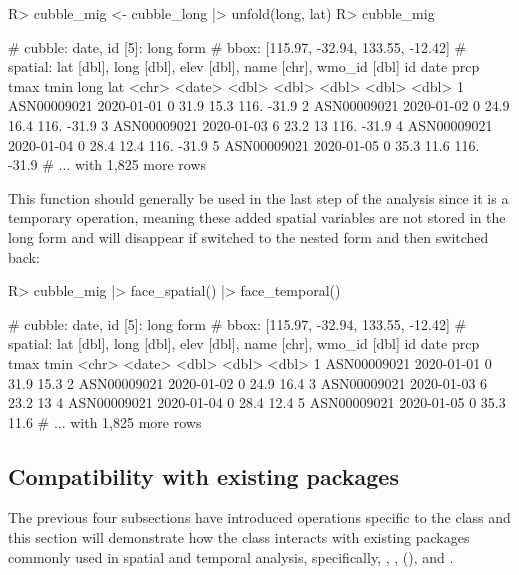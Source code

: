 \documentclass[
]{jss}
\begin{document}
\begin{CodeChunk}
\begin{CodeInput}
R> cubble_mig <- cubble_long |> unfold(long, lat)
R> cubble_mig
\end{CodeInput}
\begin{CodeOutput}
# cubble:  date, id [5]: long form
# bbox:    [115.97, -32.94, 133.55, -12.42]
# spatial: lat [dbl], long [dbl], elev [dbl], name [chr], wmo_id [dbl]
  id          date        prcp  tmax  tmin  long   lat
  <chr>       <date>     <dbl> <dbl> <dbl> <dbl> <dbl>
1 ASN00009021 2020-01-01     0  31.9  15.3  116. -31.9
2 ASN00009021 2020-01-02     0  24.9  16.4  116. -31.9
3 ASN00009021 2020-01-03     6  23.2  13    116. -31.9
4 ASN00009021 2020-01-04     0  28.4  12.4  116. -31.9
5 ASN00009021 2020-01-05     0  35.3  11.6  116. -31.9
# ... with 1,825 more rows
\end{CodeOutput}
\end{CodeChunk}

This function should generally be used in the last step of the analysis
since it is a temporary operation, meaning these added spatial variables
are not stored in the long form and will disappear if switched to the
nested form and then switched back:

\begin{CodeChunk}
\begin{CodeInput}
R> cubble_mig |> face_spatial() |> face_temporal()
\end{CodeInput}
\begin{CodeOutput}
# cubble:  date, id [5]: long form
# bbox:    [115.97, -32.94, 133.55, -12.42]
# spatial: lat [dbl], long [dbl], elev [dbl], name [chr], wmo_id [dbl]
  id          date        prcp  tmax  tmin
  <chr>       <date>     <dbl> <dbl> <dbl>
1 ASN00009021 2020-01-01     0  31.9  15.3
2 ASN00009021 2020-01-02     0  24.9  16.4
3 ASN00009021 2020-01-03     6  23.2  13  
4 ASN00009021 2020-01-04     0  28.4  12.4
5 ASN00009021 2020-01-05     0  35.3  11.6
# ... with 1,825 more rows
\end{CodeOutput}
\end{CodeChunk}

\hypertarget{compatibility-with-existing-packages}{%
\subsection{Compatibility with existing
packages}\label{compatibility-with-existing-packages}}

The previous four subsections have introduced operations specific to the
 class and this section will demonstrate how the
 class interacts with existing packages commonly used in
spatial and temporal analysis, specifically, ,
,  (), and .
\end{document}
